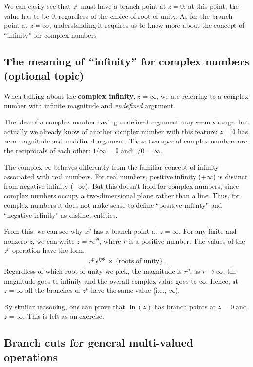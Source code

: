 \documentclass[10pt,a4paper]{article}
\begin{document}
\noindent
We can easily see that $z^p$ must have a branch point at $z = 0$: at
this point, the value has to be $0$, regardless of the choice of root
of unity. As for the branch point at $z = \infty$, understanding it
requires us to know more about the concept of ``infinity'' for complex
numbers.

\subsection{The meaning of ``infinity'' for complex numbers (optional topic)}
\label{aside-the-meaning-of-infinity-for-complex-numbers}

When talking about the \textbf{complex infinity}, $z = \infty$, we are
referring to a complex number with infinite magnitude and
\textit{undefined} argument.

The idea of a complex number having undefined argument may seem
strange, but actually we already know of another complex number with
this feature: $z = 0$ has zero magnitude and undefined argument.
These two special complex numbers are the reciprocals of each other:
$1/\infty = 0$ and $1/0 = \infty$.

The complex $\infty$ behaves differently from the familiar concept of
infinity associated with real numbers. For real numbers, positive
infinity ($+\infty$) is distinct from negative infinity
($-\infty$). But this doesn't hold for complex numbers, since complex
numbers occupy a two-dimensional plane rather than a line. Thus, for
complex numbers it does not make sense to define ``positive infinity''
and ``negative infinity'' as distinct entities.

From this, we can see why $z^p$ has a branch point at $z =
\infty$. For any finite and nonzero $z$, we can write $z =
re^{i\theta}$, where $r$ is a positive number. The values of the $z^p$
operation have the form
\begin{align}
  r^p \, e^{ip\theta}\,\times\, \{\text{roots of unity}\}.
\end{align}
Regardless of which root of unity we pick, the magnitude is $r^p$; as
$r \rightarrow \infty$, the magnitude goes to infinity and the overall
complex value goes to $\infty$. Hence, at $z = \infty$ all the
branches of $z^p$ have the same value (i.e., $\infty$).

By similar reasoning, one can prove that $\ln(z)$ has branch points at
$z = 0$ and $z = \infty$.  This is left as an exercise.

\subsection{Branch cuts for general multi-valued operations}
\label{branch-cuts-for-general-multi-valued-operations}
\end{document}
